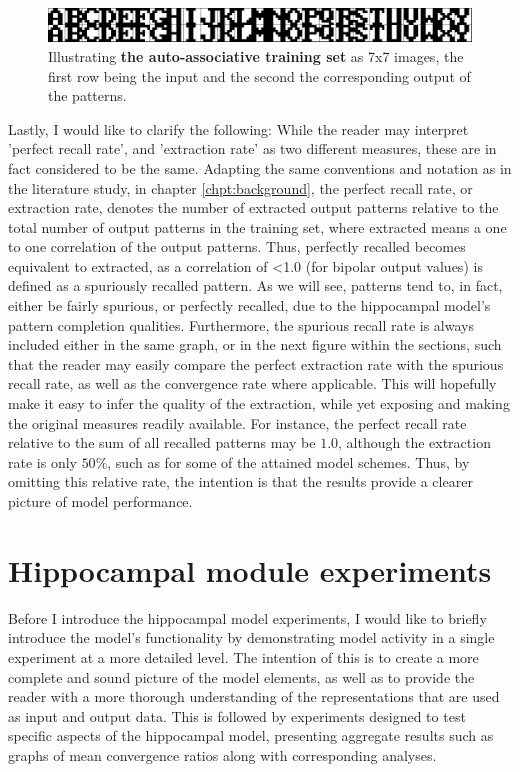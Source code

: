 \begin{figure}\label{fig:sample_letters}
    \centering
    \includegraphics[width=12cm]{fig/im_both.png}
    \caption{Illustrating \textbf{the auto-associative training set} as 7x7 images, the first row being the input and the second the corresponding output of the patterns.}
\end{figure}

Lastly, I would like to clarify the following: While the reader may interpret 'perfect recall rate', and 'extraction rate' as two different measures, these are in fact considered to be the same. Adapting the same conventions and notation as in the literature study, in chapter \ref{chpt:background}, the perfect recall rate, or extraction rate, denotes the number of extracted output patterns relative to the total number of output patterns in the training set, where extracted means a one to one correlation of the output patterns. Thus, perfectly recalled becomes equivalent to extracted, as a correlation of <1.0 (for bipolar output values) is defined as a spuriously recalled pattern. As we will see, patterns tend to, in fact, either be fairly spurious, or perfectly recalled, due to the hippocampal model's pattern completion qualities.
Furthermore, the spurious recall rate is always included either in the same graph, or in the next figure within the sections, such that the reader may easily compare the perfect extraction rate with the spurious recall rate, as well as the convergence rate where applicable. This will hopefully make it easy to infer the quality of the extraction, while yet exposing and making the original measures readily available. For instance, the perfect recall rate relative to the sum of all recalled patterns may be $1.0$, although the extraction rate is only $50 \%$, such as for some of the attained model schemes. Thus, by omitting this relative rate, the intention is that the results provide a clearer picture of model performance.

\section{Hippocampal module experiments}\label{section:hpc-experiments}

Before I introduce the hippocampal model experiments, I would like to briefly introduce the model's functionality by demonstrating model activity in a single experiment at a more detailed level. The intention of this is to create a more complete and sound picture of the model elements, as well as to provide the reader with a more thorough understanding of the representations that are used as input and output data.
This is followed by experiments designed to test specific aspects of the hippocampal model, presenting aggregate results such as graphs of mean convergence ratios along with corresponding analyses.

